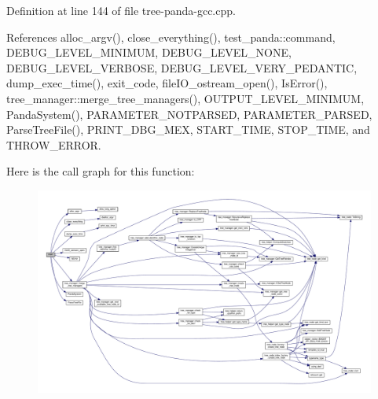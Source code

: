 Definition at line 144 of file tree-\/panda-\/gcc.\+cpp.



References alloc\+\_\+argv(), close\+\_\+everything(), test\+\_\+panda\+::command, D\+E\+B\+U\+G\+\_\+\+L\+E\+V\+E\+L\+\_\+\+M\+I\+N\+I\+M\+UM, D\+E\+B\+U\+G\+\_\+\+L\+E\+V\+E\+L\+\_\+\+N\+O\+NE, D\+E\+B\+U\+G\+\_\+\+L\+E\+V\+E\+L\+\_\+\+V\+E\+R\+B\+O\+SE, D\+E\+B\+U\+G\+\_\+\+L\+E\+V\+E\+L\+\_\+\+V\+E\+R\+Y\+\_\+\+P\+E\+D\+A\+N\+T\+IC, dump\+\_\+exec\+\_\+time(), exit\+\_\+code, file\+I\+O\+\_\+ostream\+\_\+open(), Is\+Error(), tree\+\_\+manager\+::merge\+\_\+tree\+\_\+managers(), O\+U\+T\+P\+U\+T\+\_\+\+L\+E\+V\+E\+L\+\_\+\+M\+I\+N\+I\+M\+UM, Panda\+System(), P\+A\+R\+A\+M\+E\+T\+E\+R\+\_\+\+N\+O\+T\+P\+A\+R\+S\+ED, P\+A\+R\+A\+M\+E\+T\+E\+R\+\_\+\+P\+A\+R\+S\+ED, Parse\+Tree\+File(), P\+R\+I\+N\+T\+\_\+\+D\+B\+G\+\_\+\+M\+EX, S\+T\+A\+R\+T\+\_\+\+T\+I\+ME, S\+T\+O\+P\+\_\+\+T\+I\+ME, and T\+H\+R\+O\+W\+\_\+\+E\+R\+R\+OR.

Here is the call graph for this function\+:
\nopagebreak
\begin{figure}[H]
\begin{center}
\leavevmode
\includegraphics[width=350pt]{d5/d39/tree-panda-gcc_8cpp_a3f558354c40ef4683081b73e38fc7bc4_cgraph}
\end{center}
\end{figure}
